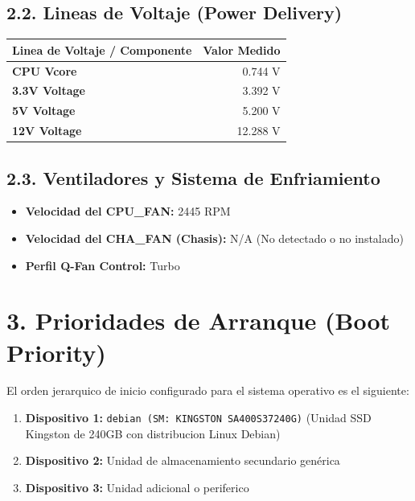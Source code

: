 \documentclass[11pt,a4paper]{article}
\begin{document}
\subsection*{2.2. Lineas de Voltaje (Power Delivery)}
\begin{center}
\begin{tabular}{lr}
\toprule
\textbf{Linea de Voltaje / Componente} & \textbf{Valor Medido} \\
\midrule
\textbf{CPU Vcore} & 0.744 V \\
\textbf{3.3V Voltage} & 3.392 V \\
\textbf{5V Voltage} & 5.200 V \\
\textbf{12V Voltage} & 12.288 V \\
\bottomrule
\end{tabular}
\end{center}

\subsection*{2.3. Ventiladores y Sistema de Enfriamiento}
\begin{itemize}
    \item \textbf{Velocidad del CPU\_FAN:} 2445 RPM
    \item \textbf{Velocidad del CHA\_FAN (Chasis):} N/A (No detectado o no instalado)
    \item \textbf{Perfil Q-Fan Control:} Turbo
\end{itemize}

\section*{3. Prioridades de Arranque (Boot Priority)}
El orden jerarquico de inicio configurado para el sistema operativo es el siguiente:
\begin{enumerate}
    \item \textbf{Dispositivo 1:} \texttt{debian (SM: KINGSTON SA400S37240G)} (Unidad SSD Kingston de 240GB con distribucion Linux Debian)
    \item \textbf{Dispositivo 2:} Unidad de almacenamiento secundario genérica
    \item \textbf{Dispositivo 3:} Unidad adicional o periferico
\end{enumerate}
\end{document}
